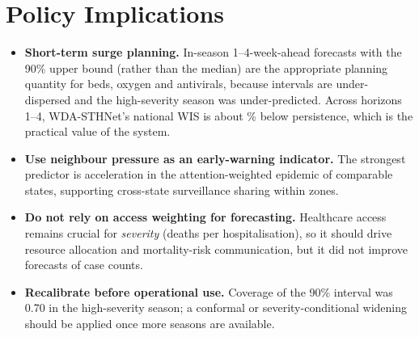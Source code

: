 \documentclass[11pt,a4paper]{article}
\begin{document}
\section{Policy Implications}
\begin{itemize}
\item \textbf{Short-term surge planning.} In-season 1--4-week-ahead forecasts with the 90\% upper bound (rather than the median) are the appropriate planning quantity for beds, oxygen and antivirals, because intervals are under-dispersed and the high-severity season was under-predicted. Across horizons 1--4, WDA-STHNet's national WIS is about \natGain\% below persistence, which is the practical value of the system.
\item \textbf{Use neighbour pressure as an early-warning indicator.} The strongest predictor is acceleration in the attention-weighted epidemic of comparable states, supporting cross-state surveillance sharing within zones.
\item \textbf{Do not rely on access weighting for forecasting.} Healthcare access remains crucial for \emph{severity} (deaths per hospitalisation), so it should drive resource allocation and mortality-risk communication, but it did not improve forecasts of case counts.
\item \textbf{Recalibrate before operational use.} Coverage of the 90\% interval was 0.70 in the high-severity season; a conformal or severity-conditional widening should be applied once more seasons are available.
\end{itemize}

\end{document}
